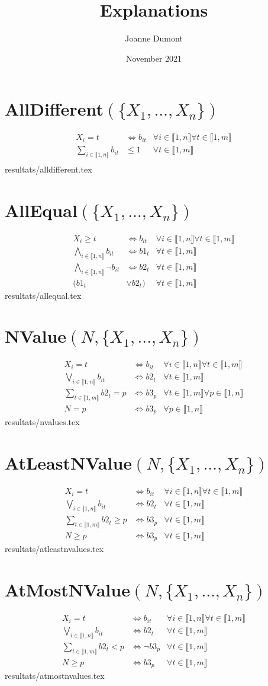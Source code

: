 \documentclass{article}
\title{Explanations}
\author{Joanne Dumont}
\date{November 2021}
\newcommand{\alldiff}{AllDifferent$(\{X_1,\ldots,X_n\})~$}
\newcommand{\alleq}{AllEqual$(\{X_1,\ldots,X_n\})~$}
\newcommand{\nvalue}{NValue$(N,\{X_1,\ldots,X_n\})~$}
\newcommand{\atlnvalue}{AtLeastNValue$(N,\{X_1,\ldots,X_n\})~$}
\newcommand{\atmnvalue}{AtMostNValue$(N,\{X_1,\ldots,X_n\})~$}
\newcommand{\I}{i\in\llbracket1,n\rrbracket}
\newcommand{\T}{t\in\llbracket1,m\rrbracket}
\newcommand{\PP}{p\in\llbracket1,n\rrbracket}
\newcommand{\fai}{\forall\I}
\newcommand{\fat}{\forall\T}
\newcommand{\fap}{\forall\PP}
\newcommand{\fit}{\fai\fat}
\begin{document}
\maketitle

\section{\alldiff}
\begin{align*}
    X_i = t &\iff b_{it}&\fai\fat\\
    \sum_{\I} b_{it}&\leq 1&\fat\\
\end{align*}
{resultats/alldifferent.tex}
\section{\alleq}
\begin{align*}
    X_i\geq t & \iff b_{it}&\fit\\
    \bigwedge_{\I} b_{it} &\iff b1_t &\fat\\
    \bigwedge_{\I} \neg b_{it} &\iff b2_t &\fat\\
    (b1_t &\vee b2_t) &\fat
\end{align*}
{resultats/allequal.tex}
\section{\nvalue}
\begin{align*}
    X_i=t &\iff b_{it}&\fit\\
    \bigvee_{\I}b_{it}&\iff b2_t&\fat\\
    \sum_{\T}b2_{t} = p&\iff b3_{p}&\fat\fap\\
    N= p &\iff b3_p&\fap
\end{align*}
{resultats/nvalues.tex}
\section{\atlnvalue}
\begin{align*}
    X_i=t &\iff b_{it}&\fit\\
    \bigvee_{\I}b_{it}&\iff b2_t&\fat\\
    \sum_{\T}b2_{t} \geq p&\iff b3_{p}&\fat\\
    N\geq p &\iff b3_p&\fat
\end{align*}
{resultats/atleastnvalues.tex}
\section{\atmnvalue}
\begin{align*}
    X_i=t &\iff b_{it}&\fit\\
    \bigvee_{\I}b_{it}&\iff b2_t&\fat\\
    \sum_{\T}b2_{t} < p&\iff \neg b3_{p}&\fat\\
    N\geq p &\iff b3_p&\fat
\end{align*}
{resultats/atmostnvalues.tex}
\end{document}
